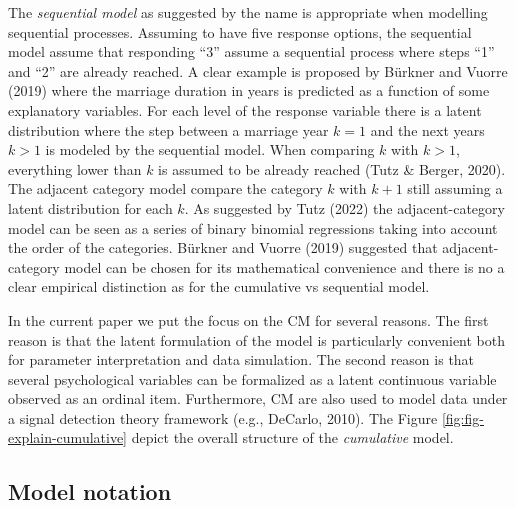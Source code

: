 \documentclass[
  man,floatsintext]{apa6}
\begin{document}
The \emph{sequential model} as suggested by the name is appropriate when modelling sequential processes. Assuming to have five response options, the sequential model assume that responding ``3'' assume a sequential process where steps ``1'' and ``2'' are already reached. A clear example is proposed by Bürkner and Vuorre (2019) where the marriage duration in years is predicted as a function of some explanatory variables. For each level of the response variable there is a latent distribution where the step between a marriage year \(k = 1\) and the next years \(k > 1\) is modeled by the sequential model. When comparing \(k\) with \(k > 1\), everything lower than \(k\) is assumed to be already reached (Tutz \& Berger, 2020). The adjacent category model compare the category \(k\) with \(k + 1\) still assuming a latent distribution for each \(k\). As suggested by Tutz (2022) the adjacent-category model can be seen as a series of binary binomial regressions taking into account the order of the categories. Bürkner and Vuorre (2019) suggested that adjacent-category model can be chosen for its mathematical convenience and there is no a clear empirical distinction as for the cumulative vs sequential model.

In the current paper we put the focus on the CM for several reasons. The first reason is that the latent formulation of the model is particularly convenient both for parameter interpretation and data simulation. The second reason is that several psychological variables can be formalized as a latent continuous variable observed as an ordinal item. Furthermore, CM are also used to model data under a signal detection theory framework (e.g., DeCarlo, 2010). The Figure \ref{fig:fig-explain-cumulative} depict the overall structure of the \emph{cumulative} model.

\subsection{Model notation}\label{model-notation}
\end{document}
